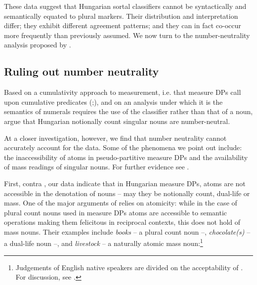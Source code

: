 \documentclass[output=paper]{langscibook}
\begin{document}

\noindent These data suggest that Hungarian sortal classifiers cannot be syntactically and semantically equated to plural markers. Their distribution and interpretation differ; they exhibit different agreement patterns; and they can in fact co-occur more frequently than previously assumed. We now turn to the number-neutrality analysis proposed by \citet{erbach-etal-19}. 

\subsection{Ruling out number neutrality} \label{schv-nem:sec:3.2}

{\sloppy Based on a cumulativity approach to measurement, i.e. that  measure DPs call upon cumulative predicates (\citealt{krifka-89, filip-92, filip-05, nakanishi-03};\linebreak \citealt{schwarzschild-06}), and on an analysis under which it is the  semantics of numerals requires the use of the classifier rather than that of a noun, \citep{krifka-95, erbach-etal-19, sudo-17} argue that Hungarian notionally count singular nouns are number-neutral.}

At a closer investigation, however, we find that number neutrality cannot accurately account for the data. Some of the phenomena we point out include: the inaccessibility of atoms in pseudo-partitive measure DPs and the availability of mass readings of singular nouns.  For further evidence see \citet{schvarcz-nemes-19}.

First, contra \citet{erbach-etal-19}, our data indicate that in Hungarian measure DPs, atoms are not accessible in the denotation of nouns -- may they be notionally count, dual-life or mass.  One of the major arguments of \citet{erbach-etal-19} relies on atomicity: while in the case of plural count nouns used in measure DPs atoms are accessible to semantic operations making them felicitous in reciprocal contexts, this does not hold of mass nouns. Their examples include \textit{books} -- a plural count noun --, \textit{chocolate(s)} -- a dual-life noun --, and \textit{livestock} -- a naturally atomic mass noun:\footnote{Judgements of English native speakers are divided on the acceptability of . For discussion, see \citet{erbach-etal-19}. } 
\end{document}
